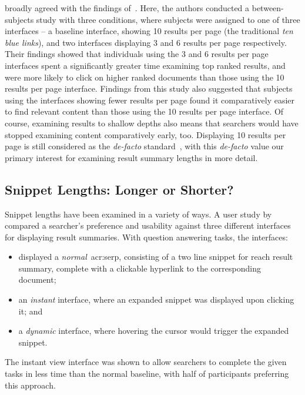 \cite{kelly2015serp_size} broadly agreed with the findings of~\cite{oulasvirta2009serp_size}. Here, the authors conducted a between-subjects study with three conditions, where subjects were assigned to one of three interfaces -- a baseline interface, showing 10 results per page (the traditional \emph{ten blue links}), and two interfaces displaying 3 and 6 results per page respectively. Their findings showed that individuals using the 3 and 6 results per page interfaces spent a significantly greater time examining top ranked results, and were more likely to click on higher ranked documents than those using the 10 results per page interface. Findings from this study also suggested that subjects using the interfaces showing fewer results per page found it comparatively easier to find relevant content than those using the 10 results per page interface. Of course, examining results to shallow depths also means that searchers would have stopped examining content comparatively early, too. Displaying 10 results per page is still considered as the \emph{de-facto} standard~\citep{hearst2009_search}, with this \emph{de-facto} value our primary interest for examining result summary lengths in more detail.

\subsection{Snippet Lengths: Longer or Shorter?}
Snippet lengths have been examined in a variety of ways. A user study by~\cite{paek2004wavelens} compared a searcher's preference and usability against three different interfaces for displaying result summaries. With question answering tasks, the interfaces:

\begin{itemize}
    \item{displayed a \emph{normal}~\gls{acr:serp}, consisting of a two line snippet for reach result summary, complete with a clickable hyperlink to the corresponding document;}
    \item{an \emph{instant} interface, where an expanded snippet was displayed upon clicking it; and}
    \item{a \emph{dynamic} interface, where hovering the cursor would trigger the expanded snippet.}
\end{itemize}

The instant view interface was shown to allow searchers to complete the given tasks in less time than the normal baseline, with half of participants preferring this approach.

